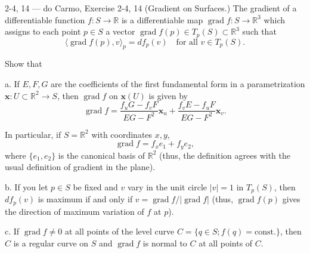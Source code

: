 \begin{exercise}{2-4, 14 — do Carmo, Exercise 2-4, 14}
(Gradient on Surfaces.) The gradient of a differentiable function $f: S \to \mathbb{R}$ is a differentiable map $\operatorname{grad} f: S \to \mathbb{R}^3$ which assigns to each point $p \in S$ a vector $\operatorname{grad} f(p) \in T_p(S) \subset \mathbb{R}^3$ such that
\[
\langle \operatorname{grad} f(p), v \rangle_p = df_p(v) \quad \text{for all } v \in T_p(S).
\]

Show that

a. If $E, F, G$ are the coefficients of the first fundamental form in a parametrization $\mathbf{x}: U \subset \mathbb{R}^2 \to S$, then $\operatorname{grad} f$ on $\mathbf{x}(U)$ is given by
\[
\operatorname{grad} f = \frac{f_u G - f_v F}{EG - F^2} \mathbf{x}_u + \frac{f_v E - f_u F}{EG - F^2} \mathbf{x}_v.
\]

In particular, if $S = \mathbb{R}^2$ with coordinates $x, y$,
\[
\operatorname{grad} f = f_x e_1 + f_y e_2,
\]
where $\{e_1, e_2\}$ is the canonical basis of $\mathbb{R}^2$ (thus, the definition agrees with the usual definition of gradient in the plane).

b. If you let $p \in S$ be fixed and $v$ vary in the unit circle $|v| = 1$ in $T_p(S)$, then $df_p(v)$ is maximum if and only if $v = \operatorname{grad} f / |\operatorname{grad} f|$ (thus, $\operatorname{grad} f(p)$ gives the direction of maximum variation of $f$ at $p$).

c. If $\operatorname{grad} f \neq 0$ at all points of the level curve $C = \{q \in S; f(q) = \mathrm{const.}\}$, then $C$ is a regular curve on $S$ and $\operatorname{grad} f$ is normal to $C$ at all points of $C$.
\end{exercise}

